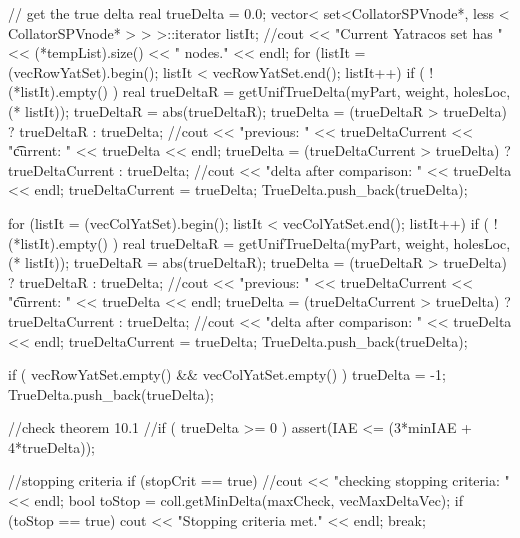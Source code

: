 \begin{DoxyCode}
{{{        // get the true delta
        real trueDelta = 0.0;
        vector< set<CollatorSPVnode*, less < CollatorSPVnode* > > >::iterator 
      listIt;   
        //cout << "Current Yatracos set has " << (*tempList).size() << "
       nodes." << endl;
        for (listIt = (vecRowYatSet).begin(); listIt < vecRowYatSet.end(); 
      listIt++) {
          if ( !(*listIt).empty() ) {
            real trueDeltaR = getUnifTrueDelta(myPart, weight, holesLoc, (*
      listIt));
            trueDeltaR = abs(trueDeltaR);
            trueDelta = (trueDeltaR > trueDelta) ? trueDeltaR : trueDelta;
            //cout << "previous: " << trueDeltaCurrent << "\t current: " <<
       trueDelta << endl;
            trueDelta = (trueDeltaCurrent > trueDelta) ? trueDeltaCurrent : 
      trueDelta;
            //cout << "delta after comparison: " << trueDelta << endl;
            trueDeltaCurrent = trueDelta;
            TrueDelta.push_back(trueDelta);
          }
        }

        for (listIt = (vecColYatSet).begin(); listIt < vecColYatSet.end(); 
      listIt++) {
          if ( !(*listIt).empty() ) {
            real trueDeltaR = getUnifTrueDelta(myPart, weight, holesLoc, (*
      listIt));
            trueDeltaR = abs(trueDeltaR);
            trueDelta = (trueDeltaR > trueDelta) ? trueDeltaR : trueDelta;
            //cout << "previous: " << trueDeltaCurrent << "\t current: " <<
       trueDelta << endl;
            trueDelta = (trueDeltaCurrent > trueDelta) ? trueDeltaCurrent : 
      trueDelta;
            //cout << "delta after comparison: " << trueDelta << endl;
            trueDeltaCurrent = trueDelta;
            TrueDelta.push_back(trueDelta);
          }
        }
        
        if ( vecRowYatSet.empty() && vecColYatSet.empty() ) 
        { trueDelta = -1; TrueDelta.push_back(trueDelta); } 
        
        //check theorem 10.1
        //if ( trueDelta >= 0 ) { assert(IAE <= (3*minIAE + 4*trueDelta)); }

        //stopping criteria
        if (stopCrit == true) {
          //cout << "checking stopping criteria: " << endl;
          bool toStop = coll.getMinDelta(maxCheck, vecMaxDeltaVec);
          if (toStop == true) {
            cout << "Stopping criteria met." << endl;
            break;
          } 
        }
        


}}}
\end{DoxyCode}
